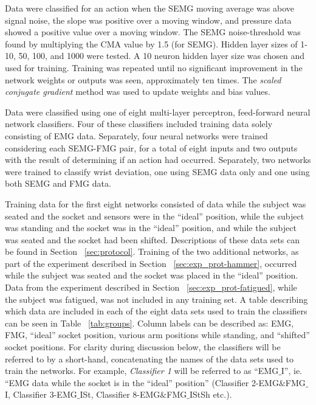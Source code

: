 \documentclass[twocolumn]{sagej}
\begin{document}
Data were classified for an action when the SEMG moving average was above signal noise, the slope was positive over a moving window, and pressure data showed a positive value over a moving window. The SEMG noise-threshold was found by multiplying the CMA value by 1.5 (for SEMG). Hidden layer sizes of 1-10, 50, 100, and 1000 were tested. A 10 neuron hidden layer size was chosen and used for training. Training was repeated until no significant improvement in the network weights or outputs was seen, approximately ten times.  The \textit{scaled conjugate gradient} method was used to update weights and bias values\cite{Moller1993}. \par \noindent%
Data were classified using one of eight multi-layer perceptron, feed-forward neural network classifiers.  Four of these classifiers included training data solely consisting of EMG data.  Separately, four neural networks were trained considering each SEMG-FMG pair, for a total of eight inputs and two outputs with the result of determining if an action had occurred.  Separately, two networks were trained to classify wrist deviation, one using SEMG data only and one using both SEMG and FMG data.\par \noindent
Training data for the first eight networks consisted of data while the subject was seated and the socket and sensors were in the ``ideal'' position, while the subject was standing and the socket was in the ``ideal'' position, and while the subject was seated and the socket had been shifted.  Descriptions of these data sets can be found in Section ~\ref{sec:protocol}.  Training of the two additional networks, as part of the experiment described in Section ~\ref{sec:exp_prot-hammer}, occurred while the subject was seated and the socket was placed in the ``ideal'' position. Data from the experiment described in Section ~\ref{sec:exp_prot-fatigued}, while the subject was fatigued, was not included in any training set. A table describing which data are included in each of the eight data sets used to train the classifiers can be seen in Table ~\ref{tab:groups}. Column labels can be described as: EMG, FMG, ``ideal'' socket position, various arm positions while standing, and ``shifted'' socket positions.  For clarity during discussion below, the classifiers will be referred to by a short-hand, concatenating the names of the data sets used to train the networks.  For example, \textit{Classifier 1} will be referred to as ``EMG$\_$I'', ie. ``EMG data while the socket is in the ``ideal'' position'' (Classifier 2-EMG$\&$FMG$\_$I, Classifier 3-EMG$\_$ISt, Classifier 8-EMG$\&$FMG$\_$IStSh etc.).
\end{document}
